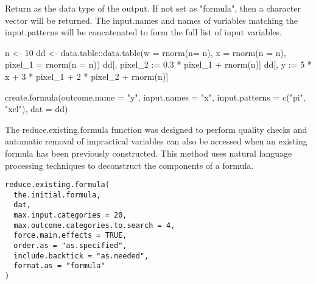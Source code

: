 \documentclass[a4paper]{book}
\begin{document}
%
\begin{Details}\relax
Return as the data type of the output.  If not set as "formula",
then a character vector will be returned.
The input.names and names of variables matching the input.patterns will be
concatenated to form the full list of input variables.
\end{Details}
%
\begin{Examples}
\begin{ExampleCode}
 n <- 10
 dd <- data.table::data.table(w = rnorm(n= n), x = rnorm(n = n), pixel_1 = rnorm(n = n))
 dd[, pixel_2 := 0.3 * pixel_1 + rnorm(n)]
 dd[, y := 5 * x + 3 * pixel_1 + 2 * pixel_2 + rnorm(n)]

 create.formula(outcome.name = "y", input.names = "x", input.patterns = c("pi", "xel"), dat = dd)

\end{ExampleCode}
\end{Examples}
%
\begin{Description}\relax
The reduce.existing.formula function was designed to perform quality checks
and automatic removal of impractical variables can also be accessed when an
existing formula has been previously constructed. This method uses natural
language processing techniques to deconstruct the components of a formula.
\end{Description}
%
\begin{Usage}
\begin{verbatim}
reduce.existing.formula(
  the.initial.formula,
  dat,
  max.input.categories = 20,
  max.outcome.categories.to.search = 4,
  force.main.effects = TRUE,
  order.as = "as.specified",
  include.backtick = "as.needed",
  format.as = "formula"
)
\end{verbatim}
\end{Usage}
%
\end{document}
